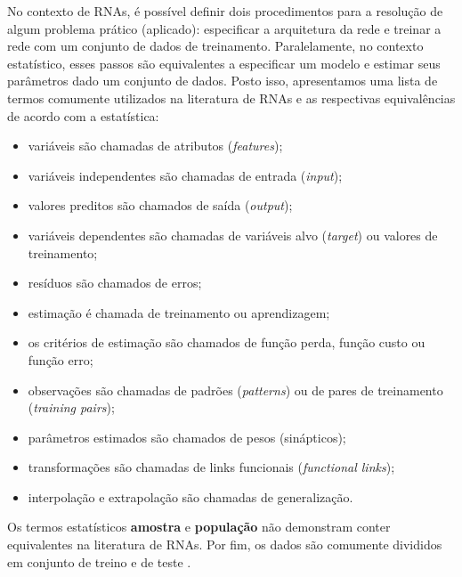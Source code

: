 \documentclass[twoside]{automatextcc}
\begin{document}
No contexto de RNAs, é possível definir dois procedimentos para a resolução de algum problema prático (aplicado): especificar a arquitetura da rede e treinar a rede com um conjunto de dados de treinamento. Paralelamente, no contexto estatístico, esses passos são equivalentes a especificar um modelo e estimar seus parâmetros dado um conjunto de dados. Posto isso, apresentamos uma lista de termos comumente utilizados na literatura de RNAs e as respectivas equivalências de acordo com a estatística:
\begin{itemize}
    \item variáveis são chamadas de atributos (\textit{features});
    \item variáveis independentes são chamadas de entrada (\textit{input});
    \item valores preditos são chamados de saída (\textit{output});
    \item variáveis dependentes são chamadas de variáveis alvo (\textit{target}) ou valores de treinamento;
    \item resíduos são chamados de erros;
    \item estimação é chamada de treinamento ou aprendizagem;
    \item os critérios de estimação são chamados de função perda, função custo ou função erro;
    \item observações são chamadas de padrões (\textit{patterns}) ou de pares de treinamento (\textit{training pairs});
    \item parâmetros estimados são chamados de pesos (sinápticos);
    \item transformações são chamadas de links funcionais (\textit{functional links});
    \item interpolação e extrapolação são chamadas de generalização.
\end{itemize}
Os termos estatísticos \textbf{amostra} e \textbf{população} não demonstram conter equivalentes na literatura de RNAs. Por fim, os dados são comumente divididos em conjunto de treino e de teste \citep{cheng1994}.



\end{document}
